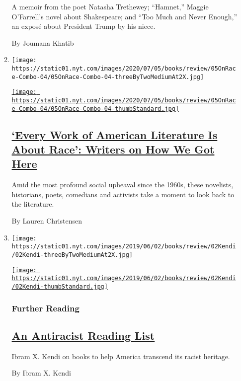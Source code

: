 \begin{enumerate}
\begin{enumerate}
    A memoir from the poet Natasha Trethewey; ``Hamnet,'' Maggie
    O'Farrell's novel about Shakespeare; and ``Too Much and Never
    Enough,'' an exposé about President Trump by his niece.

    By Joumana Khatib
  \item
    \texttt{[image: https://static01.nyt.com/images/2020/07/05/books/review/05OnRace-Combo-04/05OnRace-Combo-04-threeByTwoMediumAt2X.jpg]}

    \href{/article/books-race-america.html}{\texttt{[image: https://static01.nyt.com/images/2020/07/05/books/review/05OnRace-Combo-04/05OnRace-Combo-04-thumbStandard.jpg]}}

    \hypertarget{every-work-of-american-literature-is-about-race-writers-on-how-we-got-here}{%
    \subsection{\texorpdfstring{\href{/article/books-race-america.html}{`Every
    Work of American Literature Is About Race': Writers on How We Got
    Here}}{`Every Work of American Literature Is About Race': Writers on How We Got Here}}\label{every-work-of-american-literature-is-about-race-writers-on-how-we-got-here}}

    Amid the most profound social upheaval since the 1960s, these
    novelists, historians, poets, comedians and activists take a moment
    to look back to the literature.

    By Lauren Christensen
  \item
    \texttt{[image: https://static01.nyt.com/images/2019/06/02/books/review/02Kendi/02Kendi-threeByTwoMediumAt2X.jpg]}

    \href{/2019/05/29/books/review/antiracist-reading-list-ibram-x-kendi.html}{\texttt{[image: https://static01.nyt.com/images/2019/06/02/books/review/02Kendi/02Kendi-thumbStandard.jpg]}}

    \hypertarget{further-reading}{%
    \subsubsection{Further Reading}\label{further-reading}}

    \hypertarget{an-antiracist-reading-list}{%
    \subsection{\texorpdfstring{\href{/2019/05/29/books/review/antiracist-reading-list-ibram-x-kendi.html}{An
    Antiracist Reading
    List}}{An Antiracist Reading List}}\label{an-antiracist-reading-list}}

    Ibram X. Kendi on books to help America transcend its racist
    heritage.

    By Ibram X. Kendi
  \end{enumerate}
\end{enumerate}

